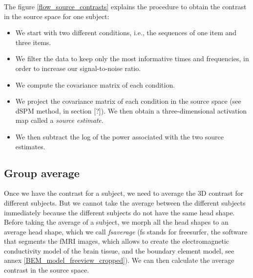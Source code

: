 The figure \ref{flow_source_contrasts} explains the procedure to obtain the contrast in the source space for one subject:
\begin{itemize}
    \item We start with two different conditions, i.e., the sequences of one item and three items.
    \item We filter the data to keep only the most informative times and frequencies, in order to increase our signal-to-noise ratio.
    \item We compute the covariance matrix of each condition.
    \item We project the covariance matrix of each condition in the source space (see dSPM method, in section [?]). We then obtain a three-dimensional activation map called a \textit{source estimate}.
    \item We then subtract the log of the power associated with the two source estimates.
\end{itemize}

\subsection{Group average}
Once we have the contrast for a subject, we need to average the 3D contrast for different subjects. But we cannot take the average between the different subjects immediately because the different subjects do not have the same head shape. Before taking the average of a subject, we morph all the head shapes to an average head shape, which we call \textit{fsaverage} (fs stands for freesurfer, the software that segments the fMRI images, which allows to create the electromagnetic conductivity model of the brain tissue, and the boundary element model, see annex \ref{BEM_model_freeview_cropped}). We can then calculate the average contrast in the source space.

